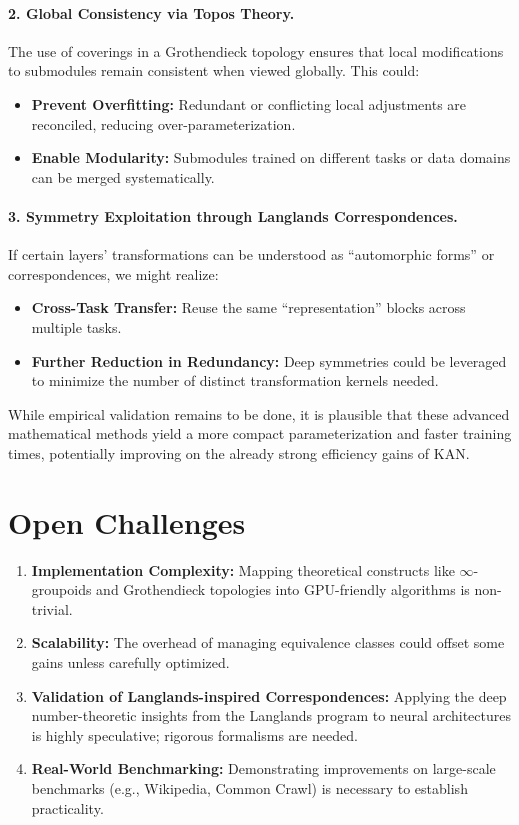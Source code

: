 \documentclass{article}
\begin{document}
\paragraph{2. Global Consistency via Topos Theory.}
The use of coverings in a Grothendieck topology ensures that local modifications to submodules remain consistent when viewed globally. This could:
\begin{itemize}
    \item \textbf{Prevent Overfitting:} Redundant or conflicting local adjustments are reconciled, reducing over-parameterization.
    \item \textbf{Enable Modularity:} Submodules trained on different tasks or data domains can be merged systematically.
\end{itemize}

\paragraph{3. Symmetry Exploitation through Langlands Correspondences.}
If certain layers’ transformations can be understood as “automorphic forms” or correspondences, we might realize:
\begin{itemize}
    \item \textbf{Cross-Task Transfer:} Reuse the same “representation” blocks across multiple tasks.
    \item \textbf{Further Reduction in Redundancy:} Deep symmetries could be leveraged to minimize the number of distinct transformation kernels needed.
\end{itemize}

While empirical validation remains to be done, it is plausible that these advanced mathematical methods yield a more compact parameterization and faster training times, potentially improving on the already strong efficiency gains of KAN.

\section{Open Challenges}
\label{sec:open_challenges}

\begin{enumerate}
    \item \textbf{Implementation Complexity:} Mapping theoretical constructs like \(\infty\)-groupoids and Grothendieck topologies into GPU-friendly algorithms is non-trivial.
    \item \textbf{Scalability:} The overhead of managing equivalence classes could offset some gains unless carefully optimized.
    \item \textbf{Validation of Langlands-inspired Correspondences:} Applying the deep number-theoretic insights from the Langlands program to neural architectures is highly speculative; rigorous formalisms are needed.
    \item \textbf{Real-World Benchmarking:} Demonstrating improvements on large-scale benchmarks (e.g., Wikipedia, Common Crawl) is necessary to establish practicality.
\end{enumerate}
\end{document}
